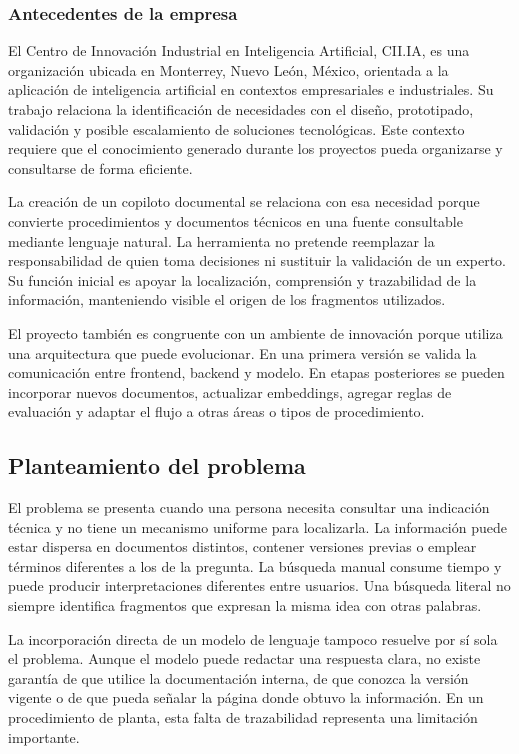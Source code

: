\subsubsection{Antecedentes de la empresa}

El Centro de Innovación Industrial en Inteligencia Artificial, CII.IA, es una organización ubicada en Monterrey, Nuevo León, México, orientada a la aplicación de inteligencia artificial en contextos empresariales e industriales. Su trabajo relaciona la identificación de necesidades con el diseño, prototipado, validación y posible escalamiento de soluciones tecnológicas. Este contexto requiere que el conocimiento generado durante los proyectos pueda organizarse y consultarse de forma eficiente.

La creación de un copiloto documental se relaciona con esa necesidad porque convierte procedimientos y documentos técnicos en una fuente consultable mediante lenguaje natural. La herramienta no pretende reemplazar la responsabilidad de quien toma decisiones ni sustituir la validación de un experto. Su función inicial es apoyar la localización, comprensión y trazabilidad de la información, manteniendo visible el origen de los fragmentos utilizados.

El proyecto también es congruente con un ambiente de innovación porque utiliza una arquitectura que puede evolucionar. En una primera versión se valida la comunicación entre frontend, backend y modelo. En etapas posteriores se pueden incorporar nuevos documentos, actualizar embeddings, agregar reglas de evaluación y adaptar el flujo a otras áreas o tipos de procedimiento.

\subsection{Planteamiento del problema}

El problema se presenta cuando una persona necesita consultar una indicación técnica y no tiene un mecanismo uniforme para localizarla. La información puede estar dispersa en documentos distintos, contener versiones previas o emplear términos diferentes a los de la pregunta. La búsqueda manual consume tiempo y puede producir interpretaciones diferentes entre usuarios. Una búsqueda literal no siempre identifica fragmentos que expresan la misma idea con otras palabras.

La incorporación directa de un modelo de lenguaje tampoco resuelve por sí sola el problema. Aunque el modelo puede redactar una respuesta clara, no existe garantía de que utilice la documentación interna, de que conozca la versión vigente o de que pueda señalar la página donde obtuvo la información. En un procedimiento de planta, esta falta de trazabilidad representa una limitación importante.

